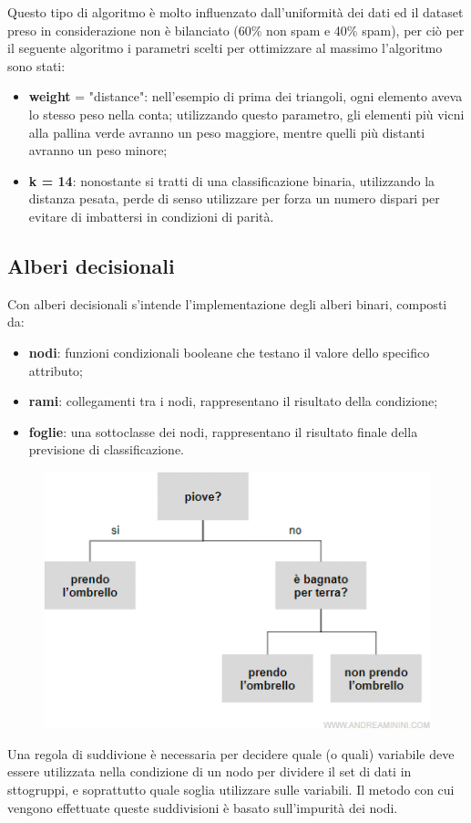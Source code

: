 \documentclass[12pt,a4paper]{article}
\begin{document}
Questo tipo di algoritmo è molto influenzato dall'uniformità dei dati ed il dataset preso in considerazione non è bilanciato (60\% non spam e 40\% spam), per ciò per il seguente algoritmo i parametri scelti per ottimizzare al massimo l'algoritmo sono stati:
\begin{itemize}
    \item \textbf{weight} = "distance": nell'esempio di prima dei triangoli, ogni elemento aveva lo stesso peso nella conta; utilizzando questo parametro, gli elementi più vicni alla pallina verde avranno un peso maggiore, mentre quelli più distanti avranno un peso minore;
    \item \textbf{k = 14}: nonostante si tratti di una classificazione binaria, utilizzando la distanza pesata, perde di senso utilizzare per forza un numero dispari per evitare di imbattersi in condizioni di parità.
\end{itemize}

\subsection{Alberi  decisionali}
Con alberi decisionali s'intende l'implementazione degli alberi binari, composti da:
\begin{itemize}
    \item \textbf{nodi}: funzioni condizionali booleane che testano il valore dello specifico attributo;
    \item \textbf{rami}: collegamenti tra i nodi, rappresentano il risultato della condizione;
    \item \textbf{foglie}: una sottoclasse dei nodi, rappresentano il risultato finale della previsione di classificazione.
\end{itemize}

\begin{figure}[h]
    \centering
    \includegraphics[width=.5\columnwidth]{decision_tree.png}
    \caption{}
\end{figure}
Una regola di suddivione è necessaria per decidere quale (o quali) variabile deve essere utilizzata nella condizione di un nodo per dividere il set di dati in sttogruppi, e soprattutto quale soglia utilizzare sulle variabili. Il metodo con cui vengono effettuate queste suddivisioni è basato sull'impurità dei nodi.
\end{document}
